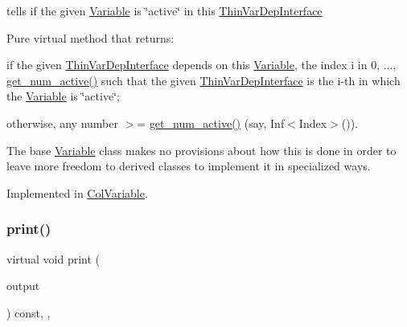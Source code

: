 tells if the given \mbox{\hyperlink{class_s_m_spp__di__unipi__it_1_1_variable}{Variable}} is \char`\"{}active\char`\"{} in this \mbox{\hyperlink{class_s_m_spp__di__unipi__it_1_1_thin_var_dep_interface}{Thin\+Var\+Dep\+Interface}} 

Pure virtual method that returns\+:


\begin{DoxyItemize}
\item if the given \mbox{\hyperlink{class_s_m_spp__di__unipi__it_1_1_thin_var_dep_interface}{Thin\+Var\+Dep\+Interface}} depends on this \mbox{\hyperlink{class_s_m_spp__di__unipi__it_1_1_variable}{Variable}}, the index i in 0, ..., \mbox{\hyperlink{class_s_m_spp__di__unipi__it_1_1_variable_ad5813b427b1bca3b32f25a97be80c3fe}{get\+\_\+num\+\_\+active()}} such that the given \mbox{\hyperlink{class_s_m_spp__di__unipi__it_1_1_thin_var_dep_interface}{Thin\+Var\+Dep\+Interface}} is the i-\/th in which the \mbox{\hyperlink{class_s_m_spp__di__unipi__it_1_1_variable}{Variable}} is \char`\"{}active\char`\"{};
\item otherwise, any number $>$= \mbox{\hyperlink{class_s_m_spp__di__unipi__it_1_1_variable_ad5813b427b1bca3b32f25a97be80c3fe}{get\+\_\+num\+\_\+active()}} (say, Inf$<$\+Index$>$()).
\end{DoxyItemize}

The base \mbox{\hyperlink{class_s_m_spp__di__unipi__it_1_1_variable}{Variable}} class makes no provisions about how this is done in order to leave more freedom to derived classes to implement it in specialized ways. 

Implemented in \mbox{\hyperlink{class_s_m_spp__di__unipi__it_1_1_col_variable_a39bd7feba71ae3c1d49c43dd27503f18}{Col\+Variable}}.

\mbox{\label{class_s_m_spp__di__unipi__it_1_1_variable_a2e7b9c9148a98c5c342e8c25cac95926}} 
\subsubsection{\texorpdfstring{print()}{print()}}
{\footnotesize\ttfamily virtual void print (\begin{DoxyParamCaption}\item[{std\+::ostream \&}]{output }\end{DoxyParamCaption}) const\hspace{0.3cm}{\ttfamily [inline]}, {\ttfamily [protected]}, {\ttfamily [virtual]}}



